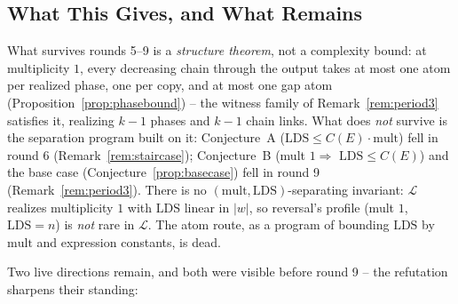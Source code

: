 \subsection{What This Gives, and What Remains}

What survives rounds 5--9 is a \emph{structure theorem}, not a
complexity bound: at multiplicity $1$, every decreasing chain through
the output takes at most one atom per realized phase, one per copy,
and at most one gap atom (Proposition~\ref{prop:phasebound}) -- the
witness family of Remark~\ref{rem:period3} satisfies it, realizing
$k-1$ phases and $k-1$ chain links.  What does \emph{not} survive is
the separation program built on it: Conjecture~A
($\mathrm{LDS} \leq C(E)\cdot\mathrm{mult}$) fell in round 6
(Remark~\ref{rem:staircase}); Conjecture~B (mult $1 \Rightarrow$
$\mathrm{LDS} \leq C(E)$) and the base case
(Conjecture~\ref{prop:basecase}) fell in round 9
(Remark~\ref{rem:period3}).  There is no $(\mathrm{mult},
\mathrm{LDS})$-separating invariant: $\mathcal{L}$ realizes
multiplicity $1$ with $\mathrm{LDS}$ linear in $|w|$, so reversal's
profile (mult $1$, $\mathrm{LDS} = n$) is \emph{not} rare in
$\mathcal{L}$.  The atom route, as a program of bounding
$\mathrm{LDS}$ by $\mathrm{mult}$ and expression constants, is dead.

Two live directions remain, and both were visible before round 9 --
the refutation sharpens their standing:

